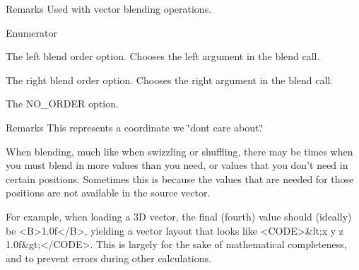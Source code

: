 \begin{DoxyRemark}{Remarks}
Used with vector blending operations. 
\end{DoxyRemark}
\begin{Desc}
\item[Enumerator]\par
\begin{description}
\item[{\em 
\hypertarget{namespacegfxmath_ac03f836d004dbed0f2219c54b8e63e3da48d2a91c97bb0e96285fd218fbd098f5}{}L\+E\+F\+T\label{namespacegfxmath_ac03f836d004dbed0f2219c54b8e63e3da48d2a91c97bb0e96285fd218fbd098f5}
}]The left blend order option. Chooses the left argument in the blend call. \item[{\em 
\hypertarget{namespacegfxmath_ac03f836d004dbed0f2219c54b8e63e3da28dcb685e33dd6cc73f168dbf003894e}{}R\+I\+G\+H\+T\label{namespacegfxmath_ac03f836d004dbed0f2219c54b8e63e3da28dcb685e33dd6cc73f168dbf003894e}
}]The right blend order option. Chooses the right argument in the blend call. \item[{\em 
\hypertarget{namespacegfxmath_ac03f836d004dbed0f2219c54b8e63e3da631e9eab7013501bd492e4730e793d27}{}N\+O\+\_\+\+O\+R\+D\+E\+R\label{namespacegfxmath_ac03f836d004dbed0f2219c54b8e63e3da631e9eab7013501bd492e4730e793d27}
}]The N\+O\+\_\+\+O\+R\+D\+E\+R option. \begin{DoxyRemark}{Remarks}
This represents a coordinate we \char`\"{}don\textquotesingle{}t care about.\char`\"{} \begin{DoxyVerb}          When blending, much like when swizzling or shuffling, there may be times when you must blend in
          more values than you need, or values that you don't need in certain positions.  Sometimes this is
          because the values that are needed for those positions are not available in the source vector.

          For example, when loading a 3D vector, the final (fourth) value should (ideally) be <B>1.0f</B>,
          yielding a vector layout that looks like <CODE>&lt;x y z 1.0f&gt;</CODE>.
          This is largely for the sake of mathematical completeness, and to prevent errors during other calculations.


\end{DoxyVerb}
\end{DoxyRemark}
\end{description}
\end{Desc}
